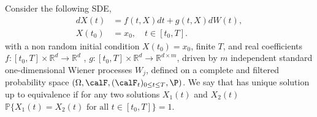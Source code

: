 Consider the following SDE,
\begin{equation}\label{eq.ap.1}
	\begin{aligned}
		dX(t) &= f(t,X)dt + g(t,X)dW(t), \\ 
		X(t_0) &=x_0, \quad
		t\in [t_0,T].
	\end{aligned}
\end{equation}
with a non random initial condition 
$X(t_{0})=x_{0}$,
finite 
$
	T
$, 
and real coefficients
$
	f:
	\left[ 
		t_{0}, T
	\right]
	\times 
	\mathbb{R}^{d} 
	\to \mathbb{R}^{d}
$
,
$
	g:	
	\left[ 
		t_{0},T
	\right]
	\times
	\mathbb{R}^{d} 
	\to 
	\mathbb{R}^{d\times m}
$,
driven by $m$ independent standard one-dimensional Wiener processes
$W_j$, defined on a complete and filtered 
probability space
$
	\left(
		\Omega, \calF , (\calF_t)_{0\leq t\leq T},\P
	\right)
$.
We say that  has unique solution up to equivalence if for any
two solutions $X_{1}(t)$ and $X_{2}(t)$ 
$
			\mathbb{P}
			\{
				X_{1}(t)=X_{2}(t)\mbox{ for all } t \in [t_{0},T]
			\}=1
		$.


